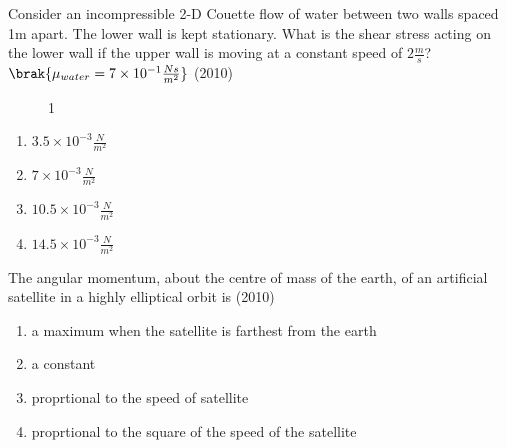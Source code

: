 
\iffalse
\chapter{2010}
\author{AI24BTECH11008}
\section{ae}
\fi

 \item Consider an incompressible 2-D Couette flow of water between two walls spaced 1m apart. The lower wall is kept stationary. What is the shear stress acting on the lower wall if the upper wall is moving at a constant speed of $2\frac{m}{s}$?$\brak{\mu_{water}=7\times 10^{-1}\frac{Ns}{m^2}}$ \hfill (2010)
 \begin{figure}[!ht]
    \centering
    \caption{1}
    \label{fig:1}
\end{figure}
 \begin{enumerate}[label=(\Alph*)]
    \item $3.5\times 10^{-3}\frac{N}{m^2}$
    \item $7\times 10^{-3}\frac{N}{m^2}$
    \item $10.5\times 10^{-3}\frac{N}{m^2}$
    \item $14.5\times 10^{-3}\frac{N}{m^2}$
 \end{enumerate}
 \item The angular momentum, about the centre of mass of the earth, of an artificial satellite in a highly elliptical orbit is \hfill (2010)
 \begin{enumerate}[label=(\Alph*)]
    \item a maximum when the satellite is farthest from the earth
    \item a constant
    \item proprtional to the speed of satellite
    \item proprtional to the square of the speed of the satellite
 \end{enumerate}
